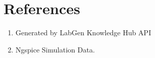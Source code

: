 \documentclass[12pt,a4paper]{article}
\begin{document}
\section{References}
\begin{enumerate}

    \item Generated by LabGen Knowledge Hub API

    \item Ngspice Simulation Data.

\end{enumerate}
\end{document}
